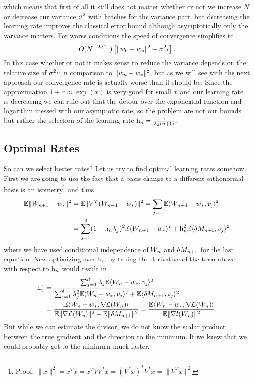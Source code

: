 which means that first of all it still does not matter whether or not we
increase \(N\) or decrease our variance \(\sigma^2\) with batches for the
variance part, but decreasing the learning rate improves the classical error
bound although asymptotically only the variance matters. For worse conditions
the speed of convergence simplifies to
\begin{align*}
	O(N^{-2\kappa^{-1}})\left[\|w_0-w_*\|^2 + \sigma^2 c\right].
\end{align*}
In this case whether or not it makes sense to reduce the variance depends on the
relative size of \(\sigma^2 c\) in comparison to \(\|w_n-w_*\|^2\),
but as we will see with the next approach our convergence rate is actually
worse than it should be. Since the approximation \(1+x\approx\exp(x)\) is
very good for small \(x\) and our learning rate is decreasing we can
rule out that the detour over the exponential function and logarithm messed
with our asymptotic rate, so the problem are not our bounds but rather the
selection of the learning rate \(\text{h}_n = \tfrac{1}{\lambda_d(n+1)}\).

\subsection{Optimal Rates}

So can we select better rates? Let us try to find optimal learning rates somehow.
First we are going to use the fact that a basis change to a different orthonormal 
basis is an isometry\footnote{
	Proof: \(\|x\|^2 = x^Tx = x^TVV^Tx = (V^T x)^T V^Tx = \|V^T x\|^2\)
}
and thus
\begin{align}
	\nonumber
	\mathbb{E}\|W_{n+1} - w_*\|^2
	&= \mathbb{E}\|V^T(W_{n+1} - w_*)\|^2
	= \sum_{j=1} \mathbb{E}\langle W_{n+1}-w_*, v_j\rangle^2\\
	\label{eq: expected square error in quadratic case}
	&= \sum_{j=1}^d (1-\text{h}_n \lambda_j)^2 \mathbb{E}\langle W_{n+1}-w_*\rangle^2
	+ \text{h}_n^2 \mathbb{E}\langle \delta M_{n+1}, v_j\rangle^2
\end{align}
where we have used conditional independence of \(W_n\) and \(\delta M_{n+1}\)
for the last equation. Now optimizing over \(\text{h}_n\) by taking the derivative
of the term above with respect to \(\text{h}_n\) would result in
\begin{align*}
	\text{h}_n^* &= \frac{
		\sum_{j=1}^d \lambda_j \mathbb{E}\langle W_n-w_*, v_j\rangle^2
	}{
		\sum_{j=1}^d\lambda_j^2\mathbb{E}\langle W_n-w_*, v_j\rangle^2
		+ \mathbb{E}\langle\delta M_{n+1}, v_j\rangle^2
	}\\
	&= \frac{
		\mathbb{E}\langle W_n - w_*, \nabla\mathcal{L}(W_n)\rangle
	}{
		\mathbb{E}\|\nabla\mathcal{L}(W_n)\|^2 + \mathbb{E}\|\delta M_{n+1}\|^2
	}
	= \frac{
		\mathbb{E}\langle W_n - w_*, \nabla\mathcal{L}(W_n)\rangle
	}{
		\mathbb{E}\|\nabla l(W_n)\|^2
	}.
\end{align*}
But while we can estimate the divisor, we do not know the scalar product between
the true gradient and the direction to the minimum. If we knew that we could
probably get to the minimum much faster.

